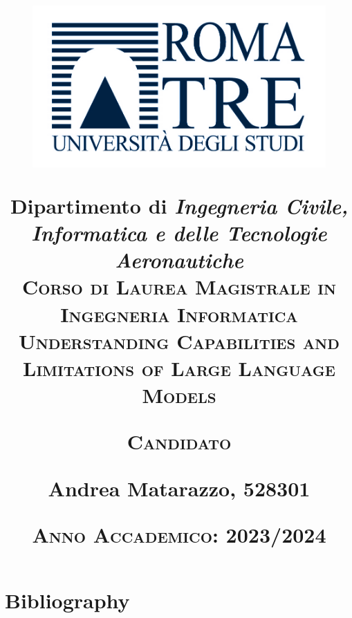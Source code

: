 \documentclass[12pt]{report}
\begin{document}
\title{
	\begin{figure}[!t]
		\centering
		\includegraphics{Logo_Roma_Tre}
	\end{figure}
	\vspace{-110pt}
	{\small Dipartimento di \textit{Ingegneria Civile, Informatica e delle Tecnologie Aeronautiche}}\\
	\vspace{10pt}
	{\large \textsc{Corso di Laurea Magistrale in Ingegneria Informatica}}\\
	\vspace{120pt}
	{\huge \textsc{Understanding Capabilities and Limitations of Large Language Models}}

	\vspace{140pt}

	 \hfill {\small \textsc{Candidato} \hspace{30pt}}

	 \hfill {\normalsize Andrea Matarazzo, 528301}

	\vspace{90pt}

	{\small \textsc{Anno Accademico}: 2023/2024}

	\date{}

}
\maketitle



\tableofcontents








\chapter*{Bibliography}
\normalem
\printbibliography[heading=none]
\end{document}
